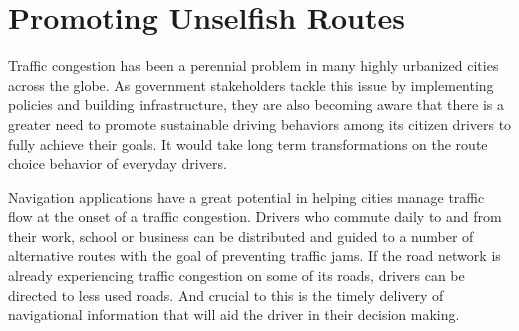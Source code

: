 \chapter{Promoting Unselfish Routes}
\label{ChapterPreTrip}

Traffic congestion has been a perennial problem in many highly urbanized cities across the globe. As government stakeholders tackle this issue by implementing policies and building infrastructure, they are also becoming aware that there is a greater need to promote sustainable driving behaviors among its citizen drivers to fully achieve their goals\cite{Attard2016TheSystems,darnton2008gsr}. It would take long term transformations on the route choice behavior of everyday drivers.

Navigation applications have a great potential in helping cities manage traffic flow at the onset of a traffic congestion. Drivers who commute daily to and from their work, school or business can be distributed and guided to a number of alternative routes with the goal of preventing traffic jams. If the road network is already experiencing traffic congestion on some of its roads, drivers can be directed to less used roads. And crucial to this is the timely delivery of navigational information that will aid the driver in their decision making. 

